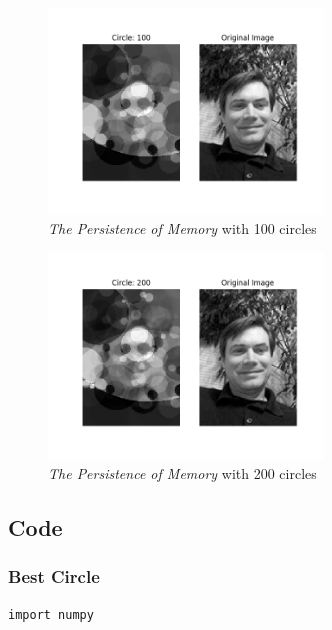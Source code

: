 \documentclass[12pt]{article}
\begin{document}
\begin{figure}[H]
\centering
\noindent\includegraphics[width=0.65\textwidth]{../results/jmcgough/jmcgough_0100.png}
\caption{\textit{The Persistence of Memory} with 100 circles}
\label{fig:jmcgough_0100}
\end{figure}

\begin{figure}[H]
\centering
\noindent\includegraphics[width=0.65\textwidth]{../results/jmcgough/jmcgough_0200.png}
\caption{\textit{The Persistence of Memory} with 200 circles}
\label{fig:jmcgough_0200}
\end{figure}



\newpage
\subsection{Code}
\subsubsection{Best Circle}
\begin{lstlisting}
import numpy
\end{lstlisting}
\end{document}
